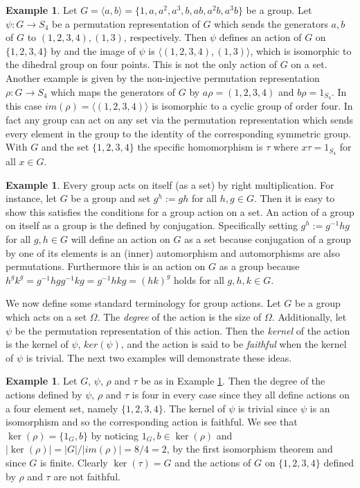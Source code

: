 \documentclass[]{article}
\theoremstyle{definition}
\newtheorem{example}[thm]{Example}
\begin{document}
\begin{example} \label{example:action}
	Let $G = \langle a,b \rangle =\{1,a,a^2,a^3,b,ab,a^2b,a^3b\}$ be a group. Let $\psi:G \rightarrow S_4$ be a permutation representation of $G$ which sends the generators $a,b$ of $G$ to $(1,2,3,4),(1,3)$, respectively. Then $\psi$ defines an action of $G$ on $\{1,2,3,4\}$ by and the image of $\psi$ is $\langle (1,2,3,4),(1,3) \rangle$, which is isomorphic to the dihedral group on four points. This is not the only action of $G$ on a set. Another example is given by the non-injective permutation representation $\rho: G \rightarrow S_4$ which maps the generators of $G$ by $a\rho = (1,2,3,4)$ and $b\rho = 1_{S_4}$. In this case $im(\rho) = \langle (1,2,3,4) \rangle$ is isomorphic to a cyclic group of order four. In fact any group can act on any set via the permutation representation which sends every element in the group to the identity of the corresponding symmetric group. With $G$ and the set $\{1,2,3,4\}$ the specific homomorphism is $\tau$ where $x\tau = 1_{S_4}$ for all $x \in G$. 
\end{example}

\begin{example} \label{example:action2}
	Every group acts on itself (as a set) by right multiplication. For instance, let $G$ be a group and set $g^h := gh$ for all $h,g \in G$. Then it is easy to show this satisfies the conditions for a group action on a set. An action of a group on itself as a group is the defined by conjugation. Specifically setting $g^h:=g^{-1}hg$ for all $g,h \in G$ will define an action on $G$ as a set because conjugation of a group by one of its elements is an (inner) automorphism and automorphisms are also permutations. Furthermore this is an action on $G$ as a group because $h^gk^g = g^{-1}hgg^{-1}kg = g^{-1}hkg = (hk)^g$ holds for all $g,h,k \in G$.
\end{example}

	We now define some standard terminology for group actions. Let $G$ be a group which acts on a set $\Omega$. The \textit{degree} of the action is the size of $\Omega$. Additionally, let $\psi$ be the permutation representation of this action. Then the \textit{kernel} of the action is the kernel of $\psi$, $ker(\psi)$, and the action is said to be \textit{faithful} when the kernel of $\psi$ is trivial. The next two examples will demonstrate these ideas.

\begin{example} \label{example:action3}
	Let $G$, $\psi$, $\rho$ and $\tau$ be as in Example \ref{example:action}. Then the degree of the actions defined by $\psi$, $\rho$ and $\tau$ is four in every case since they all define actions on a four element set, namely $\{1,2,3,4 \}$. The kernel of $\psi$ is trivial since $\psi$ is an isomorphism and so the corresponding action is faithful. We see that $\ker(\rho)=\{1_G,b\}$ by noticing $1_G,b \in \ker(\rho)$ and $|\ker(\rho)| = |G|/|im(\rho)| = 8/4 = 2$, by the first isomorphism theorem and since $G$ is finite. Clearly $\ker(\tau)=G$ and the actions of $G$ on $\{1,2,3,4\}$ defined by $\rho$ and $\tau$ are not faithful.
\end{example}
\end{document}
